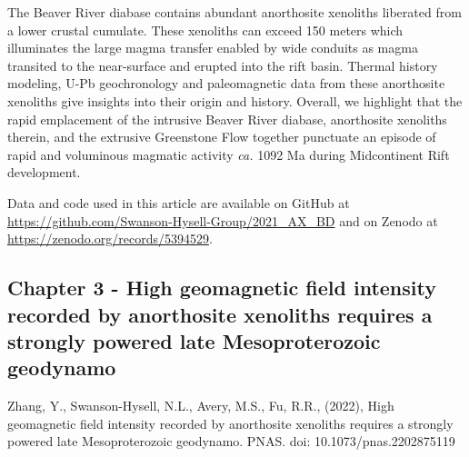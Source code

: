 \documentclass{ucbthesis}
\begin{document}
\begin{frontmatter}
The Beaver River diabase contains abundant anorthosite xenoliths liberated from a lower crustal cumulate. These xenoliths can exceed 150 meters which illuminates the large magma transfer enabled by wide conduits as magma transited to the near-surface and erupted into the rift basin. Thermal history modeling, U-Pb geochronology and paleomagnetic data from these anorthosite xenoliths give insights into their origin and history. Overall, we highlight that the rapid emplacement of the intrusive Beaver River diabase, anorthosite xenoliths therein, and the extrusive Greenstone Flow together punctuate an episode of rapid and voluminous magmatic activity \textit{ca.} 1092 Ma during Midcontinent Rift development. 

Data and code used in this article are available on GitHub at \url{https://github.com/Swanson-Hysell-Group/2021_AX_BD} and on Zenodo at \url{https://zenodo.org/records/5394529}. 


\subsection{Chapter 3 - High geomagnetic field intensity recorded by anorthosite xenoliths requires a strongly powered late Mesoproterozoic geodynamo}

Zhang, Y., Swanson-Hysell, N.L., Avery, M.S., Fu, R.R., (2022), High geomagnetic field intensity recorded by anorthosite xenoliths requires a strongly powered late Mesoproterozoic geodynamo. PNAS. doi: 10.1073/pnas.2202875119
\\


\end{frontmatter}
\end{document}
